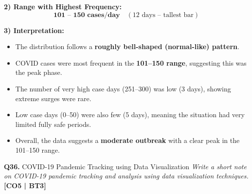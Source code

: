 \documentclass[12pt,a4paper]{article}
\newcommand{\Qno}[1]{\textbf{\color{darkred}Q#1.}}
\newcommand{\term}[1]{\textbf{\color{headingcolor}#1}}
\begin{document}
\begin{answerenv}
\textbf{2) Range with Highest Frequency:}
\[
\textbf{101 -- 150 cases/day} \quad (\text{12 days -- tallest bar})
\]

\textbf{3) Interpretation:}
\begin{itemize}[leftmargin=1.5em, itemsep=3pt]
  \item The distribution follows a \term{roughly bell-shaped (normal-like) pattern}.
  \item COVID cases were most frequent in the \textbf{101--150 range}, suggesting this was the peak phase.
  \item The number of very high case days (251--300) was low (3 days), showing extreme surges were rare.
  \item Low case days (0--50) were also few (5 days), meaning the situation had very limited fully safe periods.
  \item Overall, the data suggests a \term{moderate outbreak} with a clear peak in the 101--150 range.
\end{itemize}

\end{answerenv}

\vspace{8pt}

\begin{questionbox}{\Qno{36} COVID-19 Pandemic Tracking using Data Visualization}
\textit{Write a short note on COVID-19 pandemic tracking and analysis using data visualization techniques.} \hfill \textbf{[CO5 | BT3]}
\end{questionbox}
\end{document}
